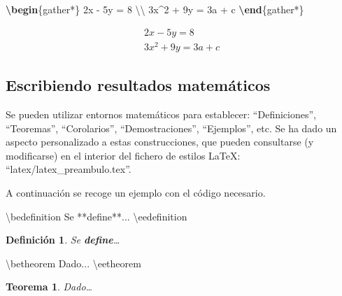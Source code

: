 \documentclass[12pt,a4paper,oneside,]{book}
\newenvironment{Shaded}{\begin{snugshade}}{\end{snugshade}}
\newcommand{\ExtensionTok}[1]{#1}
\newcommand{\KeywordTok}[1]{\textcolor[rgb]{0.13,0.29,0.53}{\textbf{#1}}}
\newcommand{\NormalTok}[1]{#1}
\newcommand{\SpecialCharTok}[1]{\textcolor[rgb]{0.00,0.00,0.00}{#1}}
\newcommand{\SpecialStringTok}[1]{\textcolor[rgb]{0.31,0.60,0.02}{#1}}
\newcounter{dummy}
\numberwithin{dummy}{section}
\theoremstyle{ocrenumbox}
\newtheorem{theoremeT}[dummy]{Teorema}  %
\theoremstyle{blacknumex}
\theoremstyle{blacknumbox}
\newtheorem{definitionT}{Definición}[section]  %
\theoremstyle{ocrenum}
\newenvironment{theorem}{\begin{tBox}\begin{theoremeT}}{\end{theoremeT}\end{tBox}}
\newenvironment{definition}{\begin{dBox}\begin{definitionT}}{\end{definitionT}\end{dBox}}
\theoremstyle{ocrenum}
\newcommand{\betheorem}{\begin{theorem}}
\newcommand{\eetheorem}{\end{theorem}}
\newcommand{\bedefinition}{\begin{definition}}
\newcommand{\eedefinition}{\end{definition}}
\begin{document}
\begin{Shaded}
\begin{Highlighting}[]
\KeywordTok{\textbackslash{}begin}\NormalTok{\{}\ExtensionTok{gather*}\NormalTok{\}}\SpecialStringTok{ }
\SpecialStringTok{2x {-} 5y =  8 }\SpecialCharTok{\textbackslash{}\textbackslash{}}\SpecialStringTok{ }
\SpecialStringTok{3x\^{}2 + 9y =  3a + c}
\KeywordTok{\textbackslash{}end}\NormalTok{\{}\ExtensionTok{gather*}\NormalTok{\}}
\end{Highlighting}
\end{Shaded}

\begin{gather*} 
2x - 5y =  8 \\ 
3x^2 + 9y =  3a + c
\end{gather*}

\hypertarget{escribiendo-resultados-matemuxe1ticos}{%
\subsection{Escribiendo resultados
matemáticos}\label{escribiendo-resultados-matemuxe1ticos}}

Se pueden utilizar entornos matemáticos para establecer:
``Definiciones'', ``Teoremas'', ``Corolarios'', ``Demostraciones'',
``Ejemplos'', etc. Se ha dado un aspecto personalizado a estas
construcciones, que pueden consultarse (y modificarse) en el interior
del fichero de estilos LaTeX: ``latex/latex\_preambulo.tex''.

A continuación se recoge un ejemplo con el código necesario.

\begin{Shaded}
\begin{Highlighting}[]
\NormalTok{\textbackslash{}bedefinition}
\NormalTok{Se **define**... }
\NormalTok{\textbackslash{}eedefinition}
\end{Highlighting}
\end{Shaded}

\bedefinition

Se \textbf{define}\ldots{} \eedefinition

\begin{Shaded}
\begin{Highlighting}[]
\NormalTok{\textbackslash{}betheorem}
\NormalTok{Dado...}
\NormalTok{\textbackslash{}eetheorem}
\end{Highlighting}
\end{Shaded}

\betheorem

Dado\ldots{} \eetheorem
\end{document}

